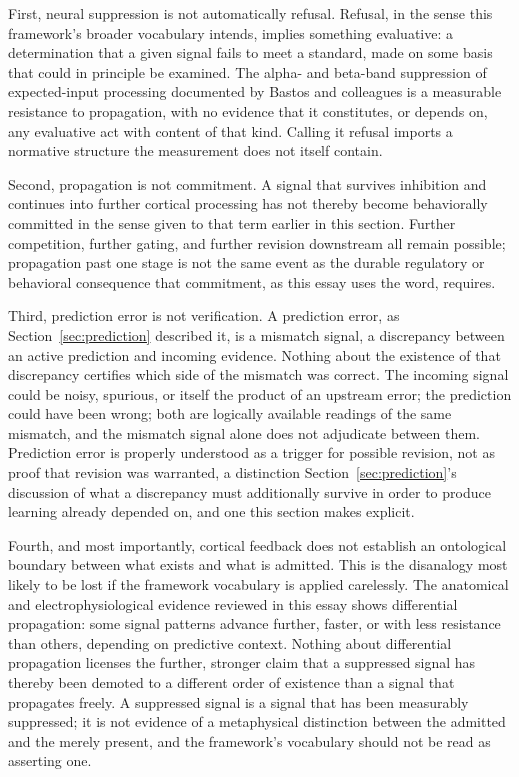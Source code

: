 \documentclass[11pt]{article}
\begin{document}
First, neural suppression is not automatically refusal. Refusal, in the sense this framework's broader vocabulary intends, implies something evaluative: a determination that a given signal fails to meet a standard, made on some basis that could in principle be examined. The alpha- and beta-band suppression of expected-input processing documented by Bastos and colleagues is a measurable resistance to propagation, with no evidence that it constitutes, or depends on, any evaluative act with content of that kind. Calling it refusal imports a normative structure the measurement does not itself contain.

Second, propagation is not commitment. A signal that survives inhibition and continues into further cortical processing has not thereby become behaviorally committed in the sense given to that term earlier in this section. Further competition, further gating, and further revision downstream all remain possible; propagation past one stage is not the same event as the durable regulatory or behavioral consequence that commitment, as this essay uses the word, requires.

Third, prediction error is not verification. A prediction error, as Section~\ref{sec:prediction} described it, is a mismatch signal, a discrepancy between an active prediction and incoming evidence. Nothing about the existence of that discrepancy certifies which side of the mismatch was correct. The incoming signal could be noisy, spurious, or itself the product of an upstream error; the prediction could have been wrong; both are logically available readings of the same mismatch, and the mismatch signal alone does not adjudicate between them. Prediction error is properly understood as a trigger for possible revision, not as proof that revision was warranted, a distinction Section~\ref{sec:prediction}'s discussion of what a discrepancy must additionally survive in order to produce learning already depended on, and one this section makes explicit.

Fourth, and most importantly, cortical feedback does not establish an ontological boundary between what exists and what is admitted. This is the disanalogy most likely to be lost if the framework vocabulary is applied carelessly. The anatomical and electrophysiological evidence reviewed in this essay shows differential propagation: some signal patterns advance further, faster, or with less resistance than others, depending on predictive context. Nothing about differential propagation licenses the further, stronger claim that a suppressed signal has thereby been demoted to a different order of existence than a signal that propagates freely. A suppressed signal is a signal that has been measurably suppressed; it is not evidence of a metaphysical distinction between the admitted and the merely present, and the framework's vocabulary should not be read as asserting one.
\end{document}
